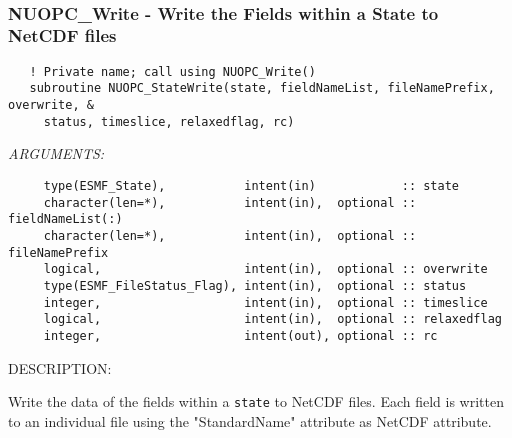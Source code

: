  
\mbox{}\hrulefill\ 
 
\subsubsection [NUOPC\_Write] {NUOPC\_Write - Write the Fields within a State to NetCDF files}


\begin{verbatim}   ! Private name; call using NUOPC_Write()
   subroutine NUOPC_StateWrite(state, fieldNameList, fileNamePrefix, overwrite, &
     status, timeslice, relaxedflag, rc)\end{verbatim}{\em ARGUMENTS:}
\begin{verbatim}     type(ESMF_State),           intent(in)            :: state
     character(len=*),           intent(in),  optional :: fieldNameList(:)
     character(len=*),           intent(in),  optional :: fileNamePrefix
     logical,                    intent(in),  optional :: overwrite
     type(ESMF_FileStatus_Flag), intent(in),  optional :: status
     integer,                    intent(in),  optional :: timeslice
     logical,                    intent(in),  optional :: relaxedflag
     integer,                    intent(out), optional :: rc\end{verbatim}
{\sf DESCRIPTION:\\ }


     Write the data of the fields within a {\tt state} to NetCDF files. Each 
     field is written to an individual file using the "StandardName" attribute
     as NetCDF attribute.
  
